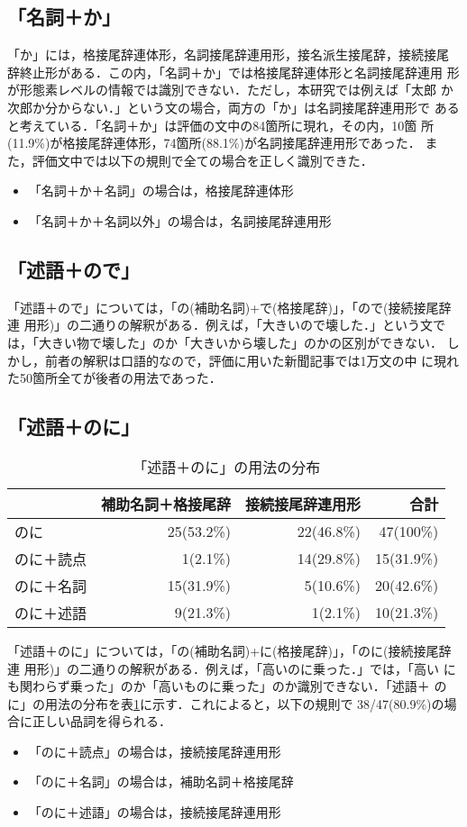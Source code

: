 \subsection{「名詞＋か」}
「か」には，格接尾辞連体形，名詞接尾辞連用形，接名派生接尾辞，接続接尾
辞終止形がある．この内，「名詞＋か」では格接尾辞連体形と名詞接尾辞連用
形が形態素レベルの情報では識別できない．ただし，本研究では例えば「太郎
か次郎か分からない．」という文の場合，両方の「か」は名詞接尾辞連用形で
あると考えている．「名詞＋か」は評価の文中の84箇所に現れ，その内，10箇
所(11.9\%)が格接尾辞連体形，74箇所(88.1\%)が名詞接尾辞連用形であった．
また，評価文中では以下の規則で全ての場合を正しく識別できた．
\begin{itemize}
\item 「名詞＋か＋名詞」の場合は，格接尾辞連体形
\item 「名詞＋か＋名詞以外」の場合は，名詞接尾辞連用形
\end{itemize}

\subsection{「述語＋ので」}
「述語＋ので」については，「の(補助名詞)+で(格接尾辞)」，「ので(接続接尾辞連
用形)」の二通りの解釈がある．例えば，「大きいので壊した．」という文で
は，「大きい物で壊した」のか「大きいから壊した」のかの区別ができない．
しかし，前者の解釈は口語的なので，評価に用いた新聞記事では1万文の中
に現れた50箇所全てが後者の用法であった．

\subsection{「述語＋のに」}
\begin{table}
\begin{center}
\begin{tabular}{|l|r|r|r|} \hline
           & 補助名詞＋格接尾辞 & 接続接尾辞連用形 & 合計 \\ \hline
のに       & 25(53.2\%) & 22(46.8\%) & 47(100\%) \\
のに＋読点 & 1(2.1\%)   & 14(29.8\%) & 15(31.9\%)\\
のに＋名詞 & 15(31.9\%) & 5(10.6\%)  & 20(42.6\%)\\
のに＋述語 & 9(21.3\%)  & 1(2.1\%)   & 10(21.3\%)\\ \hline
\end{tabular}
\end{center}
\caption{「述語＋のに」の用法の分布}
\label{noni}
\end{table}
「述語＋のに」については，「の(補助名詞)+に(格接尾辞)」，「のに(接続接尾辞連
用形)」の二通りの解釈がある．例えば，「高いのに乗った．」では，「高い
にも関わらず乗った」のか「高いものに乗った」のか識別できない．「述語＋
のに」の用法の分布を表\ref{noni}に示す．これによると，以下の規則で
38/47(80.9\%)の場合に正しい品詞を得られる．
\begin{itemize}
\item 「のに＋読点」の場合は，接続接尾辞連用形
\item 「のに＋名詞」の場合は，補助名詞＋格接尾辞
\item 「のに＋述語」の場合は，接続接尾辞連用形
\end{itemize}

